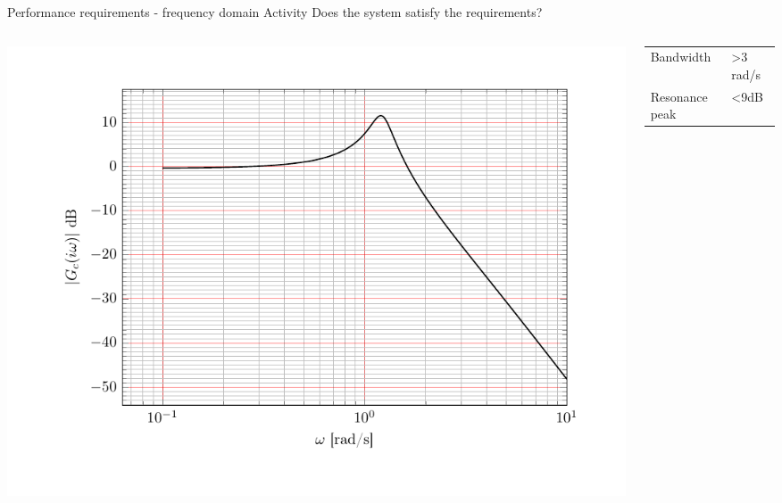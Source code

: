 \documentclass[presentation,aspectratio=169, usenames, dvipsnames]{beamer}
\begin{document}
\begin{frame}[label={sec:org344f278}]{Performance requirements - frequency domain}
\alert{Activity} Does the system satisfy the requirements?


\begin{columns}
\begin{column}{0.7\columnwidth}
\begin{center}
 \includegraphics[width=1.0\linewidth]{../../figures/bode-closed-loop-example}
\end{center}
\end{column}
\begin{column}{0.3\columnwidth}
\begin{center}
\begin{tabular}{ll}
Bandwidth & >3 rad/s\\
Resonance peak & <9dB\\
\end{tabular}
\end{center}
\end{column}
\end{columns}
\end{frame}
\end{document}
